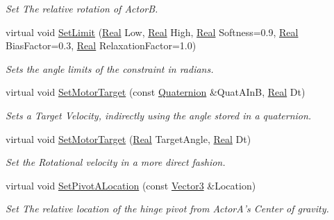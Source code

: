 \begin{DoxyCompactItemize}
\begin{DoxyCompactList}\small\item\em Set The relative rotation of ActorB. \item\end{DoxyCompactList}\item 
virtual void \hyperlink{classphys_1_1HingeConstraint_a2267ee2b124aae7a35d70f48831548bc}{SetLimit} (\hyperlink{namespacephys_af7eb897198d265b8e868f45240230d5f}{Real} Low, \hyperlink{namespacephys_af7eb897198d265b8e868f45240230d5f}{Real} High, \hyperlink{namespacephys_af7eb897198d265b8e868f45240230d5f}{Real} Softness=0.9, \hyperlink{namespacephys_af7eb897198d265b8e868f45240230d5f}{Real} BiasFactor=0.3, \hyperlink{namespacephys_af7eb897198d265b8e868f45240230d5f}{Real} RelaxationFactor=1.0)
\begin{DoxyCompactList}\small\item\em Sets the angle limits of the constraint in radians. \item\end{DoxyCompactList}\item 
virtual void \hyperlink{classphys_1_1HingeConstraint_ae3038cabdde1b676c0e6b9665807c917}{SetMotorTarget} (const \hyperlink{classphys_1_1Quaternion}{Quaternion} \&QuatAInB, \hyperlink{namespacephys_af7eb897198d265b8e868f45240230d5f}{Real} Dt)
\begin{DoxyCompactList}\small\item\em Sets a Target Velocity, indirectly using the angle stored in a quaternion. \item\end{DoxyCompactList}\item 
virtual void \hyperlink{classphys_1_1HingeConstraint_ac9eb6207043906b972c8ad897ead15df}{SetMotorTarget} (\hyperlink{namespacephys_af7eb897198d265b8e868f45240230d5f}{Real} TargetAngle, \hyperlink{namespacephys_af7eb897198d265b8e868f45240230d5f}{Real} Dt)
\begin{DoxyCompactList}\small\item\em Set the Rotational velocity in a more direct fashion. \item\end{DoxyCompactList}\item 
virtual void \hyperlink{classphys_1_1HingeConstraint_a6baadfc607e0d7c2167c9201bd4f8bdf}{SetPivotALocation} (const \hyperlink{classphys_1_1Vector3}{Vector3} \&Location)
\begin{DoxyCompactList}\small\item\em Set The relative location of the hinge pivot from ActorA's Center of gravity. \item\end{DoxyCompactList}\item 

\end{DoxyCompactItemize}
